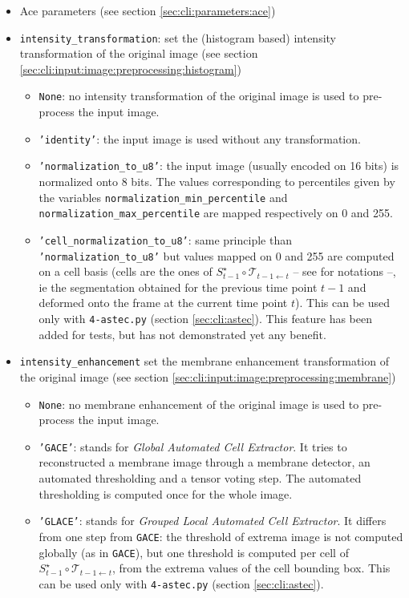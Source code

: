 \begin{itemize}
\itemsep -0.5ex
\item Ace parameters
  (see section \ref{sec:cli:parameters:ace})
  
\item \texttt{intensity\_transformation}:
set the (histogram based) intensity transformation of the original image
(see section \ref{sec:cli:input:image:preprocessing:histogram})
\begin{itemize}
\itemsep -0.5ex
\item \texttt{None}: no intensity transformation of the original image is used to pre-process the input image.
\item \texttt{'identity'}: the input image is used without any transformation.
\item \texttt{'normalization\_to\_u8'}: the input image (usually encoded on 16 bits) is normalized onto 8 bits. The values corresponding to percentiles given by the variables \texttt{normalization\_min\_percentile} and  \texttt{normalization\_max\_percentile} are mapped respectively on 0 and 255.
\item \texttt{'cell\_normalization\_to\_u8'}: same principle than \texttt{'normalization\_to\_u8'} but values mapped on 0 and 255 are computed on a cell basis (cells are the ones of $S^{\star}_{t-1} \circ \mathcal{T}_{t-1 \leftarrow t}$ -- see \cite{guignard:tel-01278725} for notations --, ie the segmentation obtained for the previous time point $t-1$ and deformed onto the frame at the current time point $t$). This can be used only with \texttt{4-astec.py}
(section \ref{sec:cli:astec}).
This feature has been added for tests, but has not demonstrated yet any benefit.
\end{itemize}

\item \texttt{intensity\_enhancement}
set the membrane enhancement transformation of the original image
(see section \ref{sec:cli:input:image:preprocessing:membrane})
\begin{itemize}
\itemsep -0.5ex
\item \texttt{None}: no membrane enhancement of the original image is used to pre-process the input image.
\item \texttt{'GACE'}:
stands for \textit{Global Automated Cell Extractor}. It tries to reconstructed a membrane image through a membrane detector, an automated thresholding and a tensor voting step. The automated thresholding is computed once for the whole image.
\item \texttt{'GLACE'}: stands for \textit{Grouped Local Automated Cell Extractor}. It differs from one step from \texttt{GACE}: the threshold of extrema image is not computed globally (as in \texttt{GACE}), but one threshold is computed per cell of $S^{\star}_{t-1} \circ \mathcal{T}_{t-1 \leftarrow t}$, from the extrema values of the cell bounding box.
This can be used only with \texttt{4-astec.py}
(section \ref{sec:cli:astec}).
\end{itemize}


\end{itemize}
